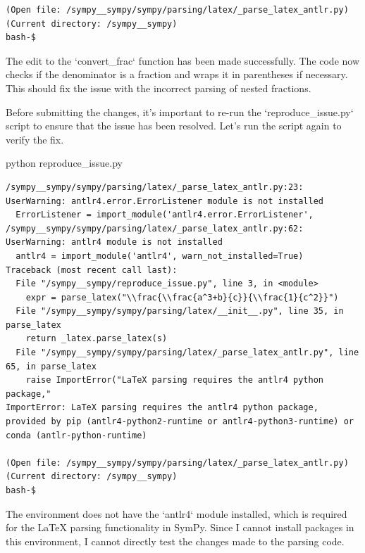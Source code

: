 {\begin{observationbox}
\begin{Verbatim}[breaklines=true, breakanywhere=true]
(Open file: /sympy__sympy/sympy/parsing/latex/_parse_latex_antlr.py)
(Current directory: /sympy__sympy)
bash-$
\end{Verbatim}
\end{observationbox}
\begin{agentbox}
The edit to the `convert\_frac` function has been made successfully. The code now checks if the denominator is a fraction and wraps it in parentheses if necessary. This should fix the issue with the incorrect parsing of nested fractions.



Before submitting the changes, it's important to re-run the `reproduce\_issue.py` script to ensure that the issue has been resolved. Let's run the script again to verify the fix.

\hrulefill
\begin{CodeVerbatim}[breaklines=true, breakanywhere=true]
python reproduce_issue.py
\end{CodeVerbatim}
\end{agentbox}
\begin{observationbox}\begin{Verbatim}[breaklines=true, breakanywhere=true]
/sympy__sympy/sympy/parsing/latex/_parse_latex_antlr.py:23: UserWarning: antlr4.error.ErrorListener module is not installed
  ErrorListener = import_module('antlr4.error.ErrorListener',
/sympy__sympy/sympy/parsing/latex/_parse_latex_antlr.py:62: UserWarning: antlr4 module is not installed
  antlr4 = import_module('antlr4', warn_not_installed=True)
Traceback (most recent call last):
  File "/sympy__sympy/reproduce_issue.py", line 3, in <module>
    expr = parse_latex("\\frac{\\frac{a^3+b}{c}}{\\frac{1}{c^2}}")
  File "/sympy__sympy/sympy/parsing/latex/__init__.py", line 35, in parse_latex
    return _latex.parse_latex(s)
  File "/sympy__sympy/sympy/parsing/latex/_parse_latex_antlr.py", line 65, in parse_latex
    raise ImportError("LaTeX parsing requires the antlr4 python package,"
ImportError: LaTeX parsing requires the antlr4 python package, provided by pip (antlr4-python2-runtime or antlr4-python3-runtime) or conda (antlr-python-runtime)

(Open file: /sympy__sympy/sympy/parsing/latex/_parse_latex_antlr.py)
(Current directory: /sympy__sympy)
bash-$
\end{Verbatim}
\end{observationbox}
\begin{agentbox}
The environment does not have the `antlr4` module installed, which is required for the LaTeX parsing functionality in SymPy. Since I cannot install packages in this environment, I cannot directly test the changes made to the parsing code.




\end{agentbox}}
